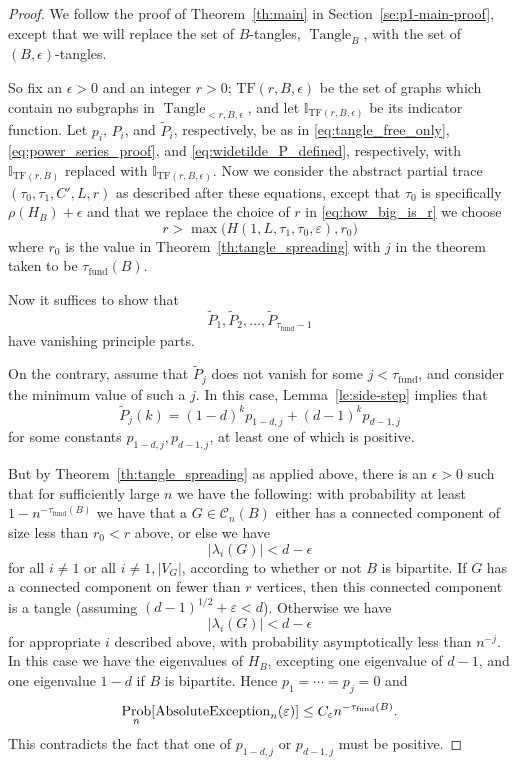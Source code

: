 \documentclass{memo-l}
\theoremstyle{plain}
\theoremstyle{definition}
\numberwithin{section}{chapter}
\numberwithin{equation}{chapter}
\newcommand{\tanglefreeindicator}{\II_{\mathrm{TF}(r,B)}} %
\newcommand{\tanglefreeeps}{{\mathrm{TF}(r,B,\epsilon)}}
\newcommand{\tanglefreeindicatoreps}{\II_{\mathrm{TF}(r,B,\epsilon)}}
\DeclareMathOperator{\Prob}{Prob}
\DeclareMathOperator{\Tangle}{Tangle}
\newcommand{\taufund}{\tau_{\mathrm{fund}}}
\theoremstyle{plain}
\theoremstyle{definition}
\newcommand\II{\mathbb{I}}
\newcommand\cC{\mathcal{C}}
\begin{document}
\begin{proof}
We follow the proof of Theorem~\ref{th:main} in
Section~\ref{se:p1-main-proof}, except that we will replace the set of
$B$-tangles, $\Tangle_B$, with the set of $(B,\epsilon)$-tangles.

So fix an $\epsilon>0$ and an integer $r>0$;
$\tanglefreeeps$ be the set of graphs which contain no subgraphs
in $\Tangle_{<r,B,\epsilon}$, and let
$\tanglefreeindicatoreps$ be its indicator function.
Let $p_i$, $P_i$, and $\widetilde P_i$, respectively, be as in 
\eqref{eq:tangle_free_only}, 
\eqref{eq:power_series_proof}, and
\eqref{eq:widetilde_P_defined}, respectively, with 
$\tanglefreeindicator$ replaced 
with $\tanglefreeindicatoreps$.
Now we consider the abstract partial trace $(\tau_0,\tau_1,C',L,r)$
as described after these
equations, except that $\tau_0$ is specifically $\rho(H_B)+\epsilon$
and that we replace the choice of $r$
in \eqref{eq:how_big_is_r} we choose
$$
r >  \max\bigl( H(1,L,\tau_1,\tau_0,\varepsilon), r_0\bigr)
$$
where $r_0$ is the value in 
Theorem~\ref{th:tangle_spreading} with $j$ in the theorem taken
to be $\taufund(B)$.

Now it suffices to show that
$$
\widetilde P_1, \widetilde P_2,\ldots,\widetilde P_{\taufund-1}
$$
have vanishing principle parts.

On the contrary, assume that $\widetilde P_j$ does not vanish for 
some $j<\taufund$, and consider the minimum value of such a $j$.
In this case, Lemma~\ref{le:side-step} implies that
$$
\widetilde P_j(k) = (1-d)^k p_{1-d,j} + (d-1)^k p_{d-1,j}
$$
for some constants $p_{1-d,j},p_{d-1,j}$, at least one of which is
positive.

But by
Theorem~\ref{th:tangle_spreading} as applied above, there is an
$\epsilon>0$ such that for sufficiently large $n$ we have the
following: with probability
at least $1-n^{-\taufund(B)}$ we have that a $G\in \cC_n(B)$ either
has a connected component of size less than $r_0<r$ above,
or else we have
$$
|\lambda_i(G)|< d-\epsilon
$$
for all $i\ne 1$ or all $i\ne 1,|V_G|$, according to whether or not
$B$ is bipartite.
If $G$ has a connected component on fewer than $r$ vertices, then
this connected component is a tangle (assuming 
$(d-1)^{1/2}+\varepsilon< d$).  Otherwise we have
$$
|\lambda_i(G)|< d-\epsilon
$$
for appropriate $i$ described above,
with probability asymptotically less than $n^{-j}$.
In this case we have the eigenvalues of $H_B$, excepting one eigenvalue
of $d-1$, and one eigenvalue $1-d$ if $B$ is bipartite.
Hence $p_1=\cdots=p_j=0$ and
$$
\Prob_n[ {\rm AbsoluteException}_n(\varepsilon) ] \leq 
C_\varepsilon n^{-\taufund(B)} .
$$
This 
contradicts the fact that one of
$p_{1-d,j}$ or $p_{d-1,j}$ must be positive.
\end{proof}
\end{document}
